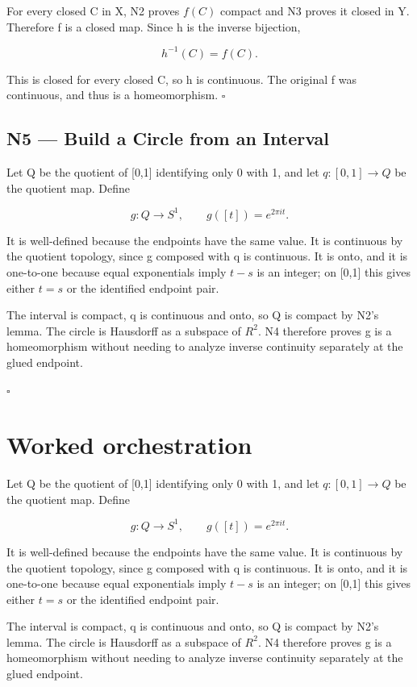 \documentclass[preprint,12pt,aps,pra,showkeys,amsmath,amssymb,superscriptaddress,floatfix]{revtex4-2}
\theoremstyle{definition}
\theoremstyle{remark}
\begin{document}
For every closed C in X, N2 proves \(f(C)\) compact and N3 proves it
closed in Y. Therefore f is a closed map. Since h is the inverse
bijection,

\[h^{-1}(C)=f(C).\]

This is closed for every closed C, so h is continuous. The original f
was continuous, and thus is a homeomorphism. \(\square\)

\subsection{N5 --- Build a Circle from an
Interval}\label{n5-build-a-circle-from-an-interval}

Let Q be the quotient of {[}0,1{]} identifying only 0 with 1, and let
\(q:[0,1]\to Q\) be the quotient map. Define

\[g:Q\to S^1,\qquad g([t])=e^{2\pi it}.\]

It is well-defined because the endpoints have the same value. It is
continuous by the quotient topology, since g composed with q is
continuous. It is onto, and it is one-to-one because equal exponentials
imply \(t-s\) is an integer; on {[}0,1{]} this gives either \(t=s\) or
the identified endpoint pair.

The interval is compact, q is continuous and onto, so Q is compact by
N2's lemma. The circle is Hausdorff as a subspace of \(R^{2}\). N4
therefore proves g is a homeomorphism without needing to analyze inverse
continuity separately at the glued endpoint.

\hfill$\square$

\section{Worked orchestration}

Let Q be the quotient of {[}0,1{]} identifying only 0 with 1, and let
\(q:[0,1]\to Q\) be the quotient map. Define

\[g:Q\to S^1,\qquad g([t])=e^{2\pi it}.\]

It is well-defined because the endpoints have the same value. It is
continuous by the quotient topology, since g composed with q is
continuous. It is onto, and it is one-to-one because equal exponentials
imply \(t-s\) is an integer; on {[}0,1{]} this gives either \(t=s\) or
the identified endpoint pair.

The interval is compact, q is continuous and onto, so Q is compact by
N2's lemma. The circle is Hausdorff as a subspace of \(R^{2}\). N4
therefore proves g is a homeomorphism without needing to analyze inverse
continuity separately at the glued endpoint.
\end{document}
